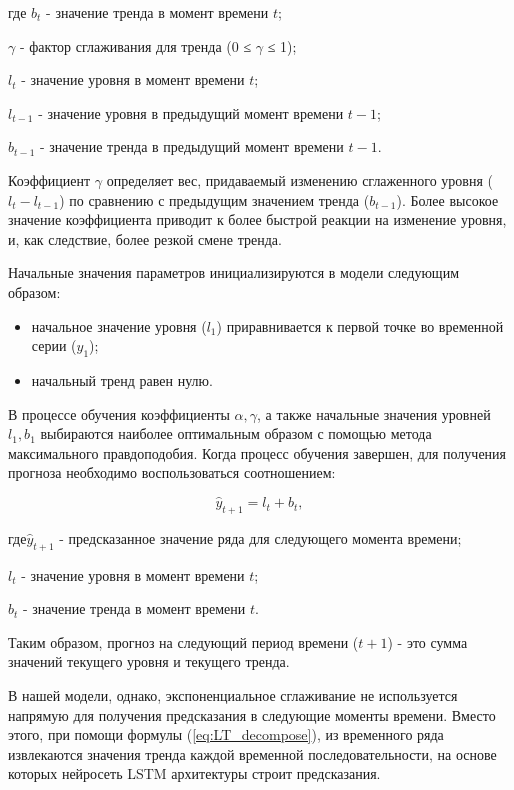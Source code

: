 где $b_t$ - значение тренда в момент времени $t$; 

$\gamma$ - фактор сглаживания для тренда (0 ≤ $\gamma$ ≤ 1);

$l_t$ - значение уровня в момент времени $t$;

$l_{t-1}$  - значение уровня в предыдущий момент времени $t-1$;

$b_{t-1}$ - значение тренда в предыдущий момент времени $t-1$.

 
 Коэффициент $\gamma$ определяет вес, придаваемый изменению сглаженного уровня ($l_t - l_{t-1}$) по сравнению с предыдущим значением тренда ($b_{t-1}$). Более высокое значение коэффициента приводит к более быстрой реакции на изменение уровня, и, как следствие, более резкой смене тренда.
 
 
Начальные значения параметров инициализируются в модели следующим образом:

\begin{itemize}
	\item начальное значение уровня ($l_1$) приравнивается к первой точке во временной серии ($y_1$);
	
	\item начальный тренд равен нулю.
	
\end{itemize}

В процессе обучения коэффициенты $\alpha, \gamma$, а также начальные значения уровней $l_1, b_1$ выбираются наиболее оптимальным образом с помощью метода максимального правдоподобия. Когда процесс обучения завершен, для получения прогноза необходимо воспользоваться соотношением:

\begin{equation}
	\label{eq:forecasting_Holt}
	\hat{y}_{t+1} = l_t + b_t, 
\end{equation}

​где ​$\hat{y}_{t+1}$ - предсказанное значение ряда для следующего момента времени;

$l_t$ - значение уровня в момент времени $t$;

$b_t$ - значение тренда в момент времени $t$. 

Таким образом, прогноз на следующий период времени ($t+1$) - это сумма значений текущего уровня и текущего тренда.

В нашей модели, однако, экспоненциальное сглаживание не используется напрямую для получения предсказания в следующие моменты времени. Вместо этого, при помощи формулы (\ref{eq:LT_decompose}), из временного ряда извлекаются значения тренда каждой временной последовательности, на основе которых нейросеть LSTM архитектуры строит предсказания. 

